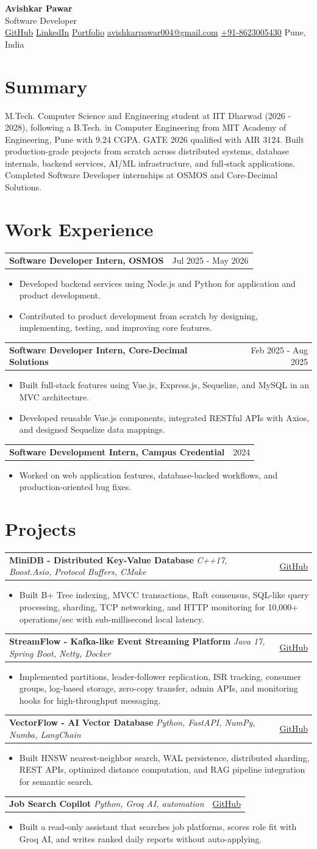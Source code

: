 \documentclass[a4paper,10pt]{article}
\makeatletter
\newcommand{\resumeHeader}[2]{
  \begin{tabularx}{\linewidth}{@{}X r@{}}
    \textbf{#1} & #2 \\
  \end{tabularx}
  \vspace{-3pt}
}
\newenvironment{joblong}[2]
  {
    \resumeHeader{#1}{#2}
    \begin{itemize}
  }
  {
    \end{itemize}
    \vspace{2pt}
  }
\newcommand{\project}[4]{
  \begin{tabularx}{\linewidth}{@{}X r@{}}
    \textbf{#1} \textbar{} \textit{#2} & \href{#3}{GitHub} \\
  \end{tabularx}
  \vspace{-5pt}
  \begin{itemize}
    \item #4
  \end{itemize}
  \vspace{1pt}
}
\providecommand{\ResumeTitle}{Software Developer}
\providecommand{\ResumeSummary}{M.Tech. Computer Science and Engineering student at IIT Dharwad (2026 - 2028), following a B.Tech. in Computer Engineering from MIT Academy of Engineering, Pune with 9.24 CGPA. GATE 2026 qualified with AIR 3124. Built production-grade projects from scratch across distributed systems, database internals, backend services, AI/ML infrastructure, and full-stack applications. Completed Software Developer internships at OSMOS and Core-Decimal Solutions.}
\providecommand{\ResumeProjects}{\ProjectMiniDB\ProjectStreamFlow\ProjectVectorFlow\ProjectJobSearch}
\newcommand{\ProjectMiniDB}{
\project
  {MiniDB - Distributed Key-Value Database}
  {C++17, Boost.Asio, Protocol Buffers, CMake}
  {https://github.com/avishkar-004/minidb}
  {Built B+ Tree indexing, MVCC transactions, Raft consensus, SQL-like query processing, sharding, TCP networking, and HTTP monitoring for 10,000+ operations/sec with sub-millisecond local latency.}
}
\newcommand{\ProjectStreamFlow}{
\project
  {StreamFlow - Kafka-like Event Streaming Platform}
  {Java 17, Spring Boot, Netty, Docker}
  {https://github.com/avishkar-004/streamflow}
  {Implemented partitions, leader-follower replication, ISR tracking, consumer groups, log-based storage, zero-copy transfer, admin APIs, and monitoring hooks for high-throughput messaging.}
}
\newcommand{\ProjectVectorFlow}{
\project
  {VectorFlow - AI Vector Database}
  {Python, FastAPI, NumPy, Numba, LangChain}
  {https://github.com/avishkar-004/vectorflow}
  {Built HNSW nearest-neighbor search, WAL persistence, distributed sharding, REST APIs, optimized distance computation, and RAG pipeline integration for semantic search.}
}
\newcommand{\ProjectJobSearch}{
\project
  {Job Search Copilot}
  {Python, Groq AI, automation}
  {https://github.com/avishkar-004/job-search-copilot}
  {Built a read-only assistant that searches job platforms, scores role fit with Groq AI, and writes ranked daily reports without auto-applying.}
}
\makeatother
\begin{document}
\fontsize{9.75}{11.1}\selectfont

\begin{center}
  {\Large \textbf{Avishkar Pawar}}\\[-1pt]
  {\normalsize \ResumeTitle}\\[2pt]
  {\small
  \href{https://github.com/avishkar-004}{GitHub} \textbar{}
  \href{https://www.linkedin.com/in/avishkarpawar}{LinkedIn} \textbar{}
  \href{https://avishkar-004.github.io}{Portfolio} \textbar{}
  \href{mailto:avishkarpawar004@gmail.com}{avishkarpawar004@gmail.com} \textbar{}
  \href{tel:+918623005430}{+91-8623005430} \textbar{}
  Pune, India}
\end{center}
\vspace{-8pt}

\section{Summary}
\ResumeSummary

\section{Work Experience}
\begin{joblong}{Software Developer Intern, OSMOS}{Jul 2025 - May 2026}
\item Developed backend services using Node.js and Python for application and product development.
\item Contributed to product development from scratch by designing, implementing, testing, and improving core features.
\end{joblong}

\begin{joblong}{Software Developer Intern, Core-Decimal Solutions}{Feb 2025 - Aug 2025}
\item Built full-stack features using Vue.js, Express.js, Sequelize, and MySQL in an MVC architecture.
\item Developed reusable Vue.js components, integrated RESTful APIs with Axios, and designed Sequelize data mappings.
\end{joblong}

\begin{joblong}{Software Development Intern, Campus Credential}{2024}
\item Worked on web application features, database-backed workflows, and production-oriented bug fixes.
\end{joblong}

\section{Projects}
\ResumeProjects
\end{document}
